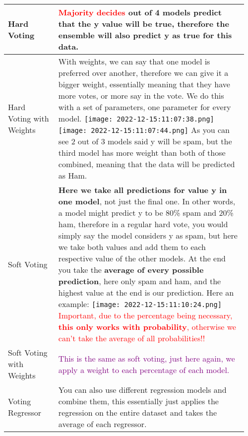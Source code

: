 \documentclass[main.tex,fontsize=8pt,paper=a4,paper=portrait,DIV=calc,]{scrartcl}
\begin{document}
\begin{table}[ht!]
\section{}
\begin{tabular}{|m{0.2\linewidth}|m{0.755\linewidth}|}
\hline
Hard Voting & 
\textcolor{red}{Majority decides}\newline
3 out of 4 models predict that the y value will be true, therefore the ensemble will also predict y as true for this data.
\\
\hline
Hard Voting with Weights & 
With weights, we can say that one model is preferred over another, therefore we can give it a bigger weight, essentially meaning that they have more votes, or more say in the vote.\newline
We do this with a set of parameters, one parameter for every model.\newline
\texttt{[image: 2022-12-15:11:07:38.png]}\texttt{[image: 2022-12-15:11:07:44.png]}\newline
As you can see 2 out of 3 models said y will be spam, but the third model has more weight than both of those combined, meaning that the data will be predicted as Ham.\\
\hline
Soft Voting & 
\textbf{Here we take all predictions for value y in one model}, not just the final one.\newline
In other words, a model might predict y to be 80\% spam and 20\% ham, therefore in a regular hard vote, you would simply say the model considers y as spam, but here we take both values and add them to each respective value of the other models.\newline
At the end you take the \textbf{average of every possible prediction}, here only spam and ham, and the highest value at the end is our prediction.\newline
Here an example: \newline
\texttt{[image: 2022-12-15:11:10:24.png]} \newline
\textcolor{red}{Important, due to the percentage being necessary, \textbf{this only works with probability}, otherwise we can't take the average of all probabilities!!}\\
\hline
Soft Voting with Weights & 
\textcolor{purple}{This is the same as soft voting, just here again, we apply a weight to each percentage of each model.}
\\
\hline
Voting Regressor & 
You can also use different regression models and combine them, this essentially just applies the regression on the entire dataset and takes the average of each regressor.

\end{tabular}
\end{table}
\end{document}
